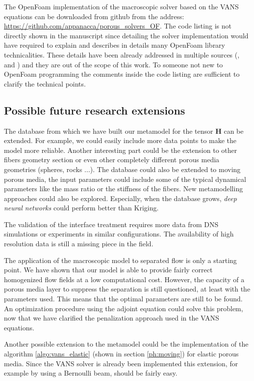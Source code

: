  The OpenFoam implementation of the macroscopic solver based on the VANS equations can be downloaded from github from the address: \url{https://github.com/appanacca/porous_solvers_OF}.
The code listing is not directly shown in the manuscript since detailing the solver implementation would have required to explain and describes in details many OpenFoam library 
technicalities. These details have been already addressed in multiple sources (\citet{jasak1996error}, \citet{moukalled2016finite} and 
\citet{maric2014openfoam}) and they are out of the scope of this work.
To someone not new to OpenFoam programming the comments inside the code listing are sufficient to clarify the technical points.




\subsection{Possible future research extensions}


 The database from which we have built our metamodel for the tensor $\mathbf{H}$ can be extended. For example, we could easily include more data points to make the model more reliable. Another interesting part could be the extension to other fibers geometry section or even other completely different porous media geometries (spheres, rocks ...). The database could also be extended to moving porous media, the input parameters could include some of the typical dynamical parameters like the mass ratio or the stiffness of the fibers. New metamodelling approaches could also be explored. Especially, when the database grows, \textit{deep neural networks} could perform better than Kriging.

 The validation of the interface treatment requires more data from DNS simulations or experiments in similar configurations. The availability of high resolution data is still a missing piece in the field.

 The application of the macroscopic model to separated flow is only a starting point. We have shown that our model is able to provide fairly correct homogenized flow fields at a low computational cost. However, the capacity of a porous media layer to suppress the separation is still questioned, at least with the parameters used. This means that the optimal parameters are still to be found. An optimization procedure using the adjoint equation could solve this problem, now that we have clarified the penalization approach used in the VANS equations.

 Another possible extension to the metamodel could be the implementation of the algorithm \ref{algo:vans_elastic} (shown in section \ref{ph:moving}) for elastic porous media. Since the VANS solver is already been implemented this extension, for example by using a Bernoulli beam, should be fairly easy.
